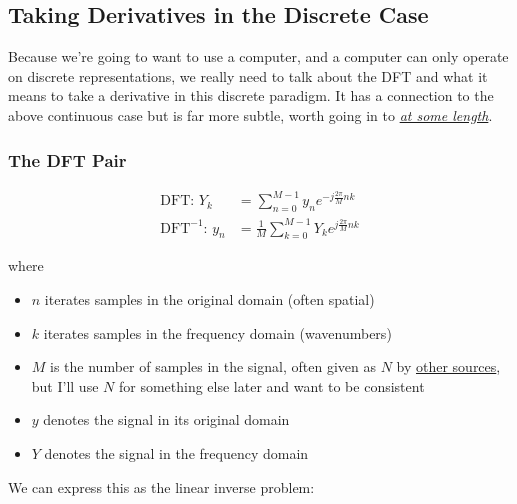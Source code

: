\documentclass[10pt]{article}
\begin{document}
\subsection{Taking Derivatives in the Discrete Case}

Because we're going to want to use a computer, and a computer can only operate on discrete representations, we really need to talk about the DFT and what it means to take a derivative in this discrete paradigm. It has a connection to the above continuous case but is far more subtle, worth going in to \textit{\href{https://www.youtube.com/watch?v=v7l3Q11DBq0&t=1299s}{at some length}}.

\subsubsection{The DFT Pair}

\begin{equation}\label{dft}
\begin{aligned}
\text{DFT: \ \ } Y_k &= \sum_{n=0}^{M-1} y_n e^{-j \frac{2\pi}{M} n k} \\
\text{DFT}^{-1} \text{: \ \ } y_n &= \frac{1}{M} \sum_{k=0}^{M-1} Y_k e^{j \frac{2\pi}{M} n k}
\end{aligned}
\end{equation}

where
\begin{itemize}[noitemsep, topsep=0pt, after=\newline]
	\item $n$ iterates samples in the original domain (often spatial)
	\item $k$ iterates samples in the frequency domain (wavenumbers)
	\item $M$ is the number of samples in the signal, often given as $N$ by \href{https://numpy.org/doc/2.1/reference/routines.fft.html}{other sources}\cite{numpy}, but I'll use $N$ for something else later and want to be consistent
	\item $y$ denotes the signal in its original domain
	\item $Y$ denotes the signal in the frequency domain
\end{itemize}

We can express this as the linear inverse problem:
\end{document}
